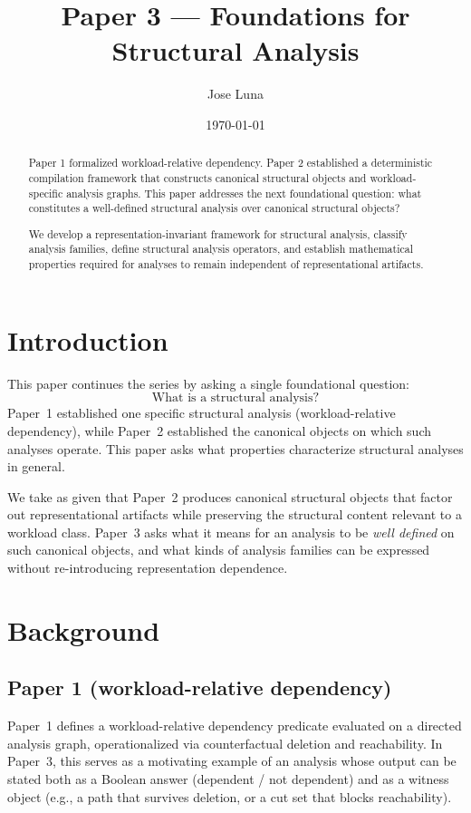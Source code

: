 \documentclass[11pt]{article}
\title{Paper 3 --- Foundations for Structural Analysis}
\author{Jose Luna}
\date{\today}
\begin{document}
\maketitle

\pagestyle{fancy}
\fancyfoot[C]{\thepage}
\renewcommand{\headrulewidth}{0.4pt}
\renewcommand{\footrulewidth}{0pt}

\begin{abstract}
Paper 1 formalized workload-relative dependency. Paper 2 established a deterministic compilation framework that constructs canonical structural objects and workload-specific analysis graphs. This paper addresses the next foundational question: what constitutes a well-defined structural analysis over canonical structural objects?

We develop a representation-invariant framework for structural analysis, classify analysis families, define structural analysis operators, and establish mathematical properties required for analyses to remain independent of representational artifacts.
\end{abstract}
\section{Introduction}
\label{sec:introduction}
This paper continues the series by asking a single foundational question:
\[
\text{What is a structural analysis?}
\]
Paper~1 established one specific structural analysis (workload-relative dependency), while Paper~2 established the canonical objects on which such analyses operate. This paper asks what properties characterize structural analyses in general.

We take as given that Paper~2 produces canonical structural objects that factor out representational artifacts while preserving the structural content relevant to a workload class. Paper~3 asks what it means for an analysis to be \emph{well defined} on such canonical objects, and what kinds of analysis families can be expressed without re-introducing representation dependence.

\section{Background}
\label{sec:background}

\subsection{Paper 1 (workload-relative dependency)}
\label{sec:background-paper1}
Paper~1 defines a workload-relative dependency predicate evaluated on a directed analysis graph, operationalized via counterfactual deletion and reachability. In Paper~3, this serves as a motivating example of an analysis whose output can be stated both as a Boolean answer (dependent / not dependent) and as a witness object (e.g., a path that survives deletion, or a cut set that blocks reachability).
\end{document}
